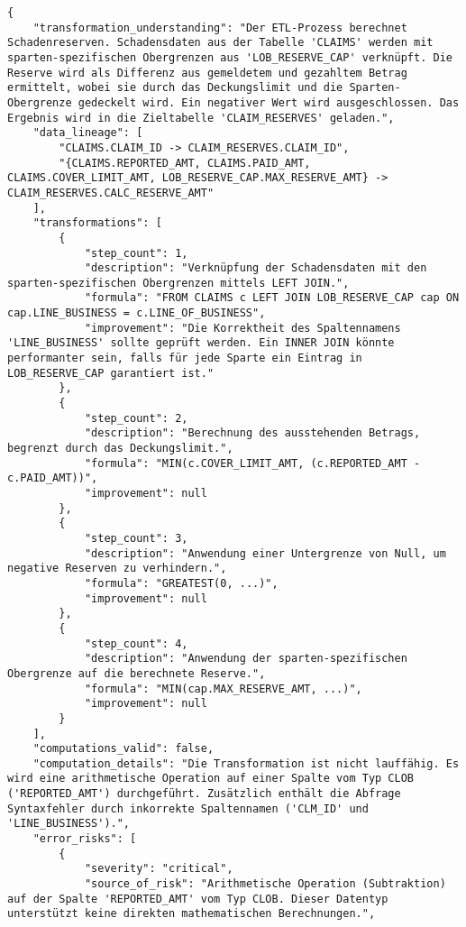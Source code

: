 \begin{lstlisting}[caption={Ausgabe: GEMINI 2.5 Pro Anwendungsfall 10 Hauptdurchlauf},label={gemini_case10_prompt1}]
{
    "transformation_understanding": "Der ETL-Prozess berechnet Schadenreserven. Schadensdaten aus der Tabelle 'CLAIMS' werden mit sparten-spezifischen Obergrenzen aus 'LOB_RESERVE_CAP' verknüpft. Die Reserve wird als Differenz aus gemeldetem und gezahltem Betrag ermittelt, wobei sie durch das Deckungslimit und die Sparten-Obergrenze gedeckelt wird. Ein negativer Wert wird ausgeschlossen. Das Ergebnis wird in die Zieltabelle 'CLAIM_RESERVES' geladen.",
    "data_lineage": [
        "CLAIMS.CLAIM_ID -> CLAIM_RESERVES.CLAIM_ID",
        "{CLAIMS.REPORTED_AMT, CLAIMS.PAID_AMT, CLAIMS.COVER_LIMIT_AMT, LOB_RESERVE_CAP.MAX_RESERVE_AMT} -> CLAIM_RESERVES.CALC_RESERVE_AMT"
    ],
    "transformations": [
        {
            "step_count": 1,
            "description": "Verknüpfung der Schadensdaten mit den sparten-spezifischen Obergrenzen mittels LEFT JOIN.",
            "formula": "FROM CLAIMS c LEFT JOIN LOB_RESERVE_CAP cap ON cap.LINE_BUSINESS = c.LINE_OF_BUSINESS",
            "improvement": "Die Korrektheit des Spaltennamens 'LINE_BUSINESS' sollte geprüft werden. Ein INNER JOIN könnte performanter sein, falls für jede Sparte ein Eintrag in LOB_RESERVE_CAP garantiert ist."
        },
        {
            "step_count": 2,
            "description": "Berechnung des ausstehenden Betrags, begrenzt durch das Deckungslimit.",
            "formula": "MIN(c.COVER_LIMIT_AMT, (c.REPORTED_AMT - c.PAID_AMT))",
            "improvement": null
        },
        {
            "step_count": 3,
            "description": "Anwendung einer Untergrenze von Null, um negative Reserven zu verhindern.",
            "formula": "GREATEST(0, ...)",
            "improvement": null
        },
        {
            "step_count": 4,
            "description": "Anwendung der sparten-spezifischen Obergrenze auf die berechnete Reserve.",
            "formula": "MIN(cap.MAX_RESERVE_AMT, ...)",
            "improvement": null
        }
    ],
    "computations_valid": false,
    "computation_details": "Die Transformation ist nicht lauffähig. Es wird eine arithmetische Operation auf einer Spalte vom Typ CLOB ('REPORTED_AMT') durchgeführt. Zusätzlich enthält die Abfrage Syntaxfehler durch inkorrekte Spaltennamen ('CLM_ID' und 'LINE_BUSINESS').",
    "error_risks": [
        {
            "severity": "critical",
            "source_of_risk": "Arithmetische Operation (Subtraktion) auf der Spalte 'REPORTED_AMT' vom Typ CLOB. Dieser Datentyp unterstützt keine direkten mathematischen Berechnungen.",

\end{lstlisting}
